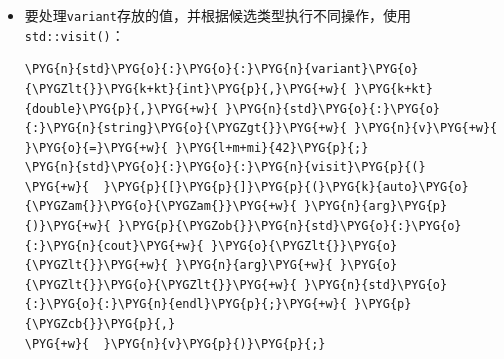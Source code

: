 \begin{itemize}

\begin{codeblockbg}
\begin{Verbatim}[commandchars=\\\{\},breaklines=true,breakanywhere=true,fontsize=\codefont,xleftmargin=17bp]
\PYG{n}{std}\PYG{o}{:}\PYG{o}{:}\PYG{n}{variant}\PYG{o}{\PYGZlt{}}\PYG{n}{std}\PYG{o}{:}\PYG{o}{:}\PYG{n}{monostate}\PYG{p}{,}\PYG{+w}{ }\PYG{n}{foo}\PYG{p}{,}\PYG{+w}{ }\PYG{k+kt}{int}\PYG{o}{\PYGZgt{}}\PYG{+w}{ }\PYG{n}{v}\PYG{p}{;}
\PYG{n}{v}\PYG{+w}{ }\PYG{o}{=}\PYG{+w}{ }\PYG{l+m+mi}{42}\PYG{p}{;}\PYG{+w}{        }\PYG{c+c1}{// v 存放 int 42}
\PYG{n}{std}\PYG{o}{:}\PYG{o}{:}\PYG{n}{cout}\PYG{+w}{ }\PYG{o}{\PYGZlt{}}\PYG{o}{\PYGZlt{}}\PYG{+w}{ }\PYG{n}{std}\PYG{o}{:}\PYG{o}{:}\PYG{n}{get}\PYG{o}{\PYGZlt{}}\PYG{k+kt}{int}\PYG{o}{\PYGZgt{}}\PYG{p}{(}\PYG{n}{v}\PYG{p}{)}\PYG{+w}{ }\PYG{o}{\PYGZlt{}}\PYG{o}{\PYGZlt{}}\PYG{+w}{ }\PYG{n}{std}\PYG{o}{:}\PYG{o}{:}\PYG{n}{endl}\PYG{p}{;}
\PYG{n}{v}\PYG{+w}{ }\PYG{o}{=}\PYG{+w}{ }\PYG{n}{foo}\PYG{p}{\PYGZob{}}\PYG{+w}{ }\PYG{l+m+mi}{42}\PYG{+w}{ }\PYG{p}{\PYGZcb{}}\PYG{p}{;}\PYG{+w}{ }\PYG{c+c1}{// v 存放 foo\PYGZob{}42\PYGZcb{}}
\PYG{n}{std}\PYG{o}{:}\PYG{o}{:}\PYG{n}{cout}\PYG{+w}{ }\PYG{o}{\PYGZlt{}}\PYG{o}{\PYGZlt{}}\PYG{+w}{ }\PYG{n}{std}\PYG{o}{:}\PYG{o}{:}\PYG{n}{get}\PYG{o}{\PYGZlt{}}\PYG{n}{foo}\PYG{o}{\PYGZgt{}}\PYG{p}{(}\PYG{n}{v}\PYG{p}{)}\PYG{p}{.}\PYG{n}{value}\PYG{+w}{ }\PYG{o}{\PYGZlt{}}\PYG{o}{\PYGZlt{}}\PYG{+w}{ }\PYG{n}{std}\PYG{o}{:}\PYG{o}{:}\PYG{n}{endl}\PYG{p}{;}
\end{Verbatim}
\end{codeblockbg}



\item 要处理\texttt{variant}存放的值，并根据候选类型执行不同操作，使用\texttt{std::\allowbreak{}visit()}：



\begin{codeblockbg}
\begin{Verbatim}[commandchars=\\\{\},breaklines=true,breakanywhere=true,fontsize=\codefont,xleftmargin=17bp]
\PYG{n}{std}\PYG{o}{:}\PYG{o}{:}\PYG{n}{variant}\PYG{o}{\PYGZlt{}}\PYG{k+kt}{int}\PYG{p}{,}\PYG{+w}{ }\PYG{k+kt}{double}\PYG{p}{,}\PYG{+w}{ }\PYG{n}{std}\PYG{o}{:}\PYG{o}{:}\PYG{n}{string}\PYG{o}{\PYGZgt{}}\PYG{+w}{ }\PYG{n}{v}\PYG{+w}{ }\PYG{o}{=}\PYG{+w}{ }\PYG{l+m+mi}{42}\PYG{p}{;}
\PYG{n}{std}\PYG{o}{:}\PYG{o}{:}\PYG{n}{visit}\PYG{p}{(}
\PYG{+w}{  }\PYG{p}{[}\PYG{p}{]}\PYG{p}{(}\PYG{k}{auto}\PYG{o}{\PYGZam{}}\PYG{o}{\PYGZam{}}\PYG{+w}{ }\PYG{n}{arg}\PYG{p}{)}\PYG{+w}{ }\PYG{p}{\PYGZob{}}\PYG{n}{std}\PYG{o}{:}\PYG{o}{:}\PYG{n}{cout}\PYG{+w}{ }\PYG{o}{\PYGZlt{}}\PYG{o}{\PYGZlt{}}\PYG{+w}{ }\PYG{n}{arg}\PYG{+w}{ }\PYG{o}{\PYGZlt{}}\PYG{o}{\PYGZlt{}}\PYG{+w}{ }\PYG{n}{std}\PYG{o}{:}\PYG{o}{:}\PYG{n}{endl}\PYG{p}{;}\PYG{+w}{ }\PYG{p}{\PYGZcb{}}\PYG{p}{,}
\PYG{+w}{  }\PYG{n}{v}\PYG{p}{)}\PYG{p}{;}
\end{Verbatim}
\end{codeblockbg}

\end{itemize}


